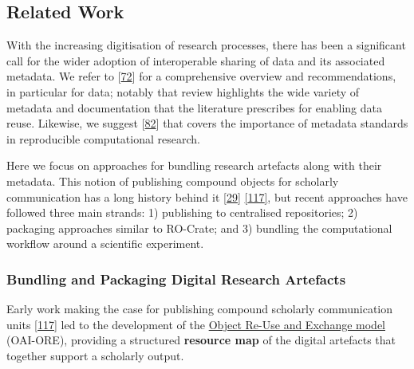 \hypertarget{relatedwork}{%
\subsection{Related Work}\label{relatedwork}}

With the increasing digitisation of research processes, there has been a
significant call for the wider adoption of interoperable sharing of data
and its associated metadata. We refer to
{[}\href{https://doi.org/10.1016/j.patter.2020.100136}{72}{]} for a
comprehensive overview and recommendations, in particular for data;
notably that review highlights the wide variety of metadata and
documentation that the literature prescribes for enabling data reuse.
Likewise, we suggest
{[}\href{https://doi.org/10.1016/j.patter.2021.100322}{82}{]} that
covers the importance of metadata standards in reproducible
computational research.

Here we focus on approaches for bundling research artefacts along with
their metadata. This notion of publishing compound objects for scholarly
communication has a long history behind it
{[}\href{https://doi.org/10.1190/1.1822162}{29}{]}
\href{http://icl.utk.edu/ctwatch/quarterly/articles/2007/08/interoperability-for-the-discovery-use-and-re-use-of-units-of-scholarly-communication/}{{[}117{]}},
but recent approaches have followed three main strands: 1) publishing to
centralised repositories; 2) packaging approaches similar to RO-Crate;
and 3) bundling the computational workflow around a scientific
experiment.

\hypertarget{bundling-and-packaging-digital-research-artefacts}{%
\subsubsection{Bundling and Packaging Digital Research
Artefacts}\label{bundling-and-packaging-digital-research-artefacts}}

Early work making the case for publishing compound scholarly
communication units
\href{http://icl.utk.edu/ctwatch/quarterly/articles/2007/08/interoperability-for-the-discovery-use-and-re-use-of-units-of-scholarly-communication/}{{[}117{]}}
led to the development of the
\href{http://www.openarchives.org/ore/1.0/primer}{Object Re-Use and
Exchange model} (OAI-ORE), providing a structured \textbf{resource map}
of the digital artefacts that together support a scholarly output.


